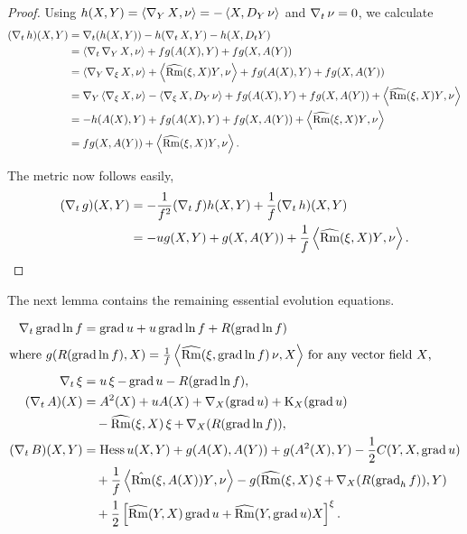 \documentclass{amsart}
\begin{document}
\begin{proof}
Using $h(X,Y) = \ip{\D_Y X}{\nor} = -\ip{X}{D_Y \nor}$ and $\D_t\nor = 0$, we calculate
\[
\begin{split}
(\D_t h) (X, Y) &= \D_t (h(X, Y)) - h(\D_t X, Y) - h(X, D_t Y) \\
&= \ip{\D_t \D_Y X}{\nor} + f g(A(X), Y) + f g(X, A(Y)) \\
&= \ip{\D_Y \D_{\vel} X}{\nor} + \ip{\widehat{\Rm}(\vel, X) Y}{\nor} + f g(A(X), Y) + f g(X, A(Y))\\
&= \D_Y \ip{\D_{\vel} X}{\nor} - \ip{\D_{\vel} X}{D_Y \nor} + f g(A(X), Y) + f g(X, A(Y)) + \ip{\widehat{\Rm}(\vel, X) Y}{\nor} \\
&= - h(A(X), Y) + f g(A(X), Y) + f g(X, A(Y)) + \ip{\widehat{\Rm}(\vel, X) Y}{\nor} \\
&= fg(X, A(Y)) + \ip{\widehat{\Rm}(\vel, X) Y}{\nor}.
\end{split}
\]

The metric now follows easily,
\[
\begin{split}
(\D_t g) (X, Y) &= -\frac{1}{f^2} (\D_t f) h(X, Y) + \frac{1}{f} (\D_t h) (X, Y) \\
&= -u g(X, Y) + g(X, A(Y)) + \frac{1}{f} \ip{\widehat{\Rm}(\vel, X) Y}{\nor}.
\end{split}
\]
\end{proof}

The next lemma contains the remaining essential evolution equations.

\begin{lemma}
\label{lem:evolutions}
\begin{align*}
\D_t \grad \ln f &= \grad u + u \grad \ln f + R(\grad \ln f) \\
\intertext{where $g(R({\grad \ln f}), X) = \frac{1}{f} \ip{\widehat{\Rm}(\vel, \grad \ln f) \nor}{X}$ for any vector field $X$,}
\D_t \vel &= u\vel - \grad u - R(\grad \ln f), \\
(\D_t A)(X) &= A^2(X) + u A(X) + \nabla_X (\grad u) + \diff_X (\grad u) \\
&\quad - \widehat{\Rm} (\vel, X) \vel + \D_X (R(\grad \ln f)), \\
(\D_t B) (X, Y) &= \hess u (X, Y) + g(A(X), A(Y)) + g(A^2(X), Y) - \frac{1}{2} C(Y, X, \grad u) \\
&\quad +\frac{1}{f} \ip{\hat{\Rm} (\vel, A(X))Y}{\nor} - g(\widehat{\Rm}(\vel, X)\vel  + \D_X (R(\grad_h f)), Y) \\
&\quad + \frac{1}{2} \left[\widehat{\Rm} (Y, X)\grad u +  \widehat{\Rm} (Y, \grad u) X\right]^{\vel}.
\end{align*}
\end{lemma}
\end{document}
